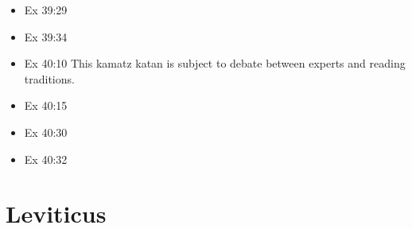\documentclass[14pt]{book}
\begin{document}
\begin{multicols}{2}
\begin{itemize}
\item Ex 39:29

\item Ex 39:34

\item Ex 40:10 This kamatz katan is subject to debate between experts and reading traditions.

\item Ex 40:15

\item Ex 40:30

\item Ex 40:32
\end{itemize}\end{multicols}
\section{Leviticus}
\end{document}
